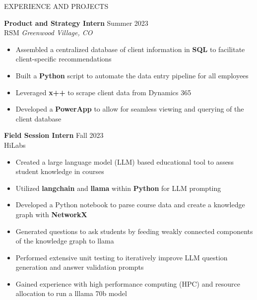 \documentclass{resume} %
\begin{document}
\begin{rSection}{EXPERIENCE AND PROJECTS}

\textbf{Product and Strategy Intern} \hfill Summer 2023\\
RSM \hfill \textit{Greenwood Village, CO}
\vspace{-6pt}
 \begin{itemize}
    \itemsep -6pt {} 
     \item Assembled a centralized database of client information in \textbf{SQL} to facilitate client-specific recommendations 
     \item Built a \textbf{Python} script to automate the data entry pipeline for all employees
     \item Leveraged \textbf{x++} to scrape client data from Dynamics 365
     \item Developed a \textbf{PowerApp} to allow for seamless viewing and querying of the client database
 \end{itemize}
 

\textbf{Field Session Intern} \hfill Fall 2023\\
HiLabs \hfill
\vspace{-6pt}
 \begin{itemize}
    \itemsep -6pt {} 
    \item Created a large language model (LLM) based educational tool to assess student knowledge in courses
    \item Utilized \textbf{langchain} and \textbf{llama} within \textbf{Python} for LLM prompting
    \item Developed a Python notebook to parse course data and create a knowledge graph with \textbf{NetworkX}
    \item Generated questions to ask students by feeding weakly connected components of the knowledge graph to llama
    \item Performed extensive unit testing to iteratively improve LLM question generation and answer validation prompts
    \item Gained experience with high performance computing (HPC) and resource allocation to run a lllama 70b model
 \end{itemize}
 

%
%


\end{rSection}
\end{document}
